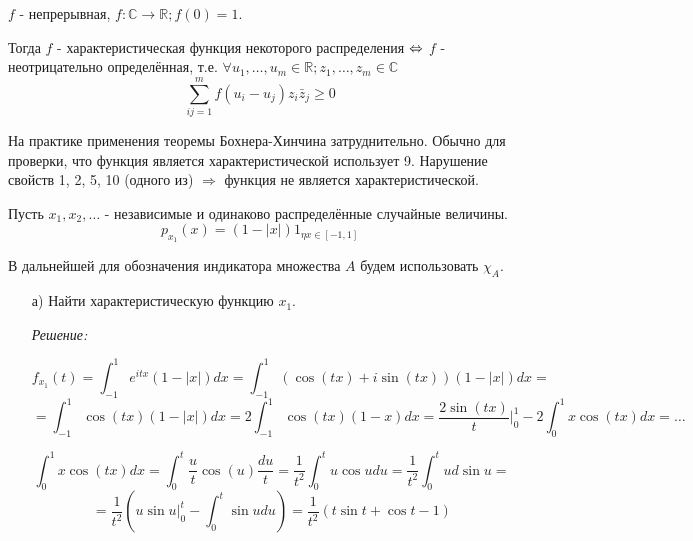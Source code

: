 \begin{theorem}
	$f$ - непрерывная, $f: \mathbb{C} \to \mathbb{R}; f(0) = 1$.
	
	Тогда $f$ - характеристическая функция некоторого распределения $\operatorname{\Leftrightarrow}$ $f$ - неотрицательно определённая, т.е. $\forall u_1, \dots, u_m \in \mathbb{R}; z_1, \dots, z_m \in \mathbb{C}$
	\[ \sum_{ij = 1}^{m} f ( u_i - u_j ) z_i \bar z_j \ge 0 \]
\end{theorem}
\begin{remark}
	На практике применения теоремы Бохнера-Хинчина затруднительно. Обычно для проверки, что функция является характеристической использует 9. Нарушение свойств 1, 2, 5, 10 (одного из) $\Rightarrow$ функция не является характеристической.
\end{remark}
\begin{exmp}\label{second_exmple}
	Пусть $x_1, x_2, \dots$ - независимые и одинаково распределённые случайные величины.
	\[ p_{x_1} (x) = ( 1 - |x| ) 1_{\eta x \in [-1, 1]} \]
	
	\begin{center}
		\qquad
	\end{center}
	
	В дальнейшей для обозначения индикатора множества $A$ будем использовать $\chi_A$.
	
	\begin{enumerate}
		\item[а)] Найти характеристическую функцию $x_1$.
		
		\textit{Решение:}
		
		\[ f_{x_1} (t) = \int_{-1}^{1} e^{it x} (1 - |x|) dx = \int_{-1}^{1} ( \cos (tx) + i \sin (tx) ) (1 - |x|) dx = \]
		\[ = \int_{-1}^{1} \cos (tx) (1 - |x|) dx = 2 \int_{-1}^{1} \cos (tx) (1 - x) dx = \frac{2 \sin (tx)}{t} \bigg|_{0}^{1} - 2 \int_{0}^{1} x \cos (tx) dx = \dots \]
		
		\[
		\int_{0}^{1} x \cos (tx) dx = \int_{0}^{t} \frac{u}{t} \cos (u) \frac{du}{t} = \frac{1}{t^2} \int_{0}^{t} u \cos u du = \frac{1}{t^2} \int_{0}^{t} u d \sin u =
		\]
		\[
		= \frac{1}{t^2} \left( u \sin u \bigg|_{0}^{t} - \int_{0}^{t} \sin u du \right) = \frac{1}{t^2} (t \sin t + \cos t - 1)
		\]
		

\end{enumerate}
\end{exmp}

